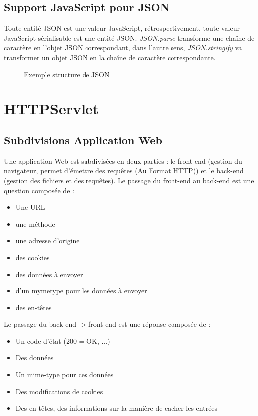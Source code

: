 \documentclass{article}[12pt]
\begin{document}
\subsection{Support JavaScript pour JSON}
Toute entité JSON est une valeur JavaScript, rétrospectivement, toute valeur JavaScript sérialisable est une entité JSON. \emph{JSON.parse} transforme une chaîne de caractère en l'objet JSON correspondant, dans l'autre sens, \emph{JSON.stringify} va transformer un objet JSON en la chaîne de caractère correspondante.
\begin{figure}[H]
	\centering
    \caption{Exemple structure de JSON}
\end{figure}
\section{HTTPServlet}
\subsection{Subdivisions Application Web}
Une application Web est subdivisées en deux parties : le front-end (gestion du navigateur, permet d'émettre des requêtes (Au Format HTTP)) et le back-end (gestion des fichiers et des requêtes).
\newline
\newline
Le passage du front-end au back-end est une question composée de :
\begin{itemize}
	\item Une URL
    \item une méthode
    \item une adresse d'origine
    \item des cookies
    \item des données à envoyer
    \item d'un mymetype pour les données à envoyer
    \item des en-têtes 
\end{itemize}
Le passage du back-end -> front-end est une réponse composée de : 
\begin{itemize}
	\item Un code d'état (200 = OK, ...)
    \item Des données
    \item Un mime-type pour ces données
    \item Des modifications de cookies
    \item Des en-têtes, des informations sur la manière de cacher les entrées
\end{itemize}
\end{document}
